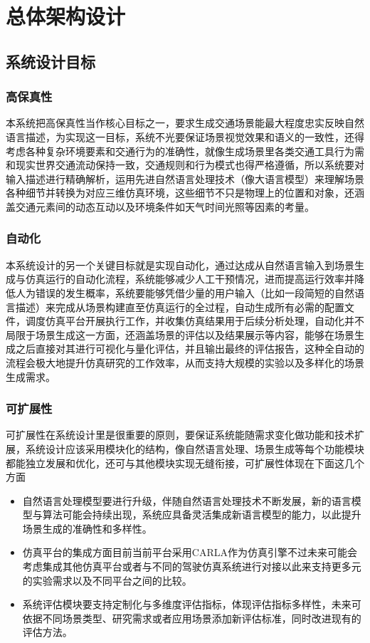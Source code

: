 \chapter{总体架构设计}
\section{系统设计目标}
\subsection{高保真性}
本系统把高保真性当作核心目标之一，要求生成交通场景能最大程度忠实反映自然语言描述，为实现这一目标，系统不光要保证场景视觉效果和语义的一致性，还得考虑各种复杂环境要素和交通行为的准确性，就像生成场景里各类交通工具行为需和现实世界交通流动保持一致，交通规则和行为模式也得严格遵循，所以系统要对输入描述进行精确解析，运用先进自然语言处理技术（像大语言模型）来理解场景各种细节并转换为对应三维仿真环境，这些细节不只是物理上的位置和对象，还涵盖交通元素间的动态互动以及环境条件如天气时间光照等因素的考量。

\subsection{自动化}
本系统设计的另一个关键目标就是实现自动化，通过达成从自然语言输入到场景生成与仿真运行的自动化流程，系统能够减少人工干预情况，进而提高运行效率并降低人为错误的发生概率，系统要能够凭借少量的用户输入（比如一段简短的自然语言描述）来完成从场景构建直至仿真运行的全过程，自动生成所有必需的配置文件，调度仿真平台开展执行工作，并收集仿真结果用于后续分析处理，自动化并不局限于场景生成这一方面，还涵盖场景的评估以及结果展示等内容，能够在场景生成之后直接对其进行可视化与量化评估，并且输出最终的评估报告，这种全自动的流程会极大地提升仿真研究的工作效率，从而支持大规模的实验以及多样化的场景生成需求。

\subsection{可扩展性}
可扩展性在系统设计里是很重要的原则，要保证系统能随需求变化做功能和技术扩展，系统设计应该采用模块化的结构，像自然语言处理、场景生成等每个功能模块都能独立发展和优化，还可与其他模块实现无缝衔接，可扩展性体现在下面这几个方面
\begin{itemize}
	\item 自然语言处理模型要进行升级，伴随自然语言处理技术不断发展，新的语言模型与算法可能会持续出现，系统应具备灵活集成新语言模型的能力，以此提升场景生成的准确性和多样性。
	\item 仿真平台的集成方面目前当前平台采用CARLA作为仿真引擎不过未来可能会考虑集成其他仿真平台或者与不同的驾驶仿真系统进行对接以此来支持更多元的实验需求以及不同平台之间的比较。
	\item 系统评估模块要支持定制化与多维度评估指标，体现评估指标多样性，未来可依据不同场景类型、研究需求或者应用场景添加新评估标准，同时改进现有的评估方法。
\end{itemize}

